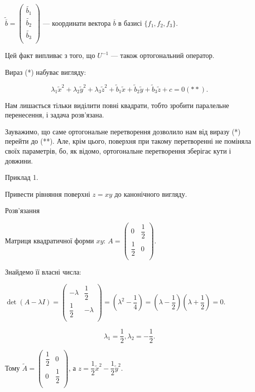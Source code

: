 $\tilde{\overline{b}} = \begin{pmatrix}
	\tilde{b_1} \\
	\tilde{b_2} \\
	\tilde{b_3} \\
\end{pmatrix}$ --- координати вектора $\overline{b}$ в базисі $\{f_1, f_2, f_3\}$.

Цей факт випливає з того, що $U^{-1}$ --- також ортогональний оператор.

Вираз (*) набуває вигляду:

$$\lambda_1 \tilde{x}^2 + \lambda_2 \tilde{y}^2 + \lambda_3 \tilde{z}^2
+ \tilde{b}_1 \tilde{x} + \tilde{b}_2 \tilde{y} + \tilde{b}_3 \tilde{z}
+ c = 0 (**).$$

Нам лишається тільки виділити повні квадрати, тобто зробити
паралельне перенесення, і задача розв’язана.

Зауважимо, що саме ортогональне перетворення дозволило нам від
виразу (*) перейти до (**). Але, крім цього, поверхня при такому
перетворенні не поміняла своїх параметрів, бо, як відомо, ортогональне
перетворення зберігає кути і довжини.

Приклад 1.

Привести рівняння поверхні $z = x y$ до канонічного вигляду.

Розв’язання

Матриця квадратичної форми $x y$: $A = \begin{pmatrix}
	0 & \dfrac{1}{2} \\
	\dfrac{1}{2} & 0 \\
\end{pmatrix}.$

Знайдемо її власні числа: 

$\det(A-\lambda I) = \begin{pmatrix}
	-\lambda & \dfrac{1}{2} \\
	\dfrac{1}{2} & -\lambda \\
\end{pmatrix} = (\lambda^2 - \dfrac{1}{4}) = (\lambda - \dfrac{1}{2})(\lambda + \dfrac{1}{2}) = 0.$

$$\lambda_1 = \dfrac{1}{2}, \lambda_2 = -\dfrac{1}{2}.$$

Тому $\tilde{A} = \begin{pmatrix}
	\dfrac{1}{2} & 0 \\
	0 & \dfrac{1}{2} \\
\end{pmatrix}$, а $z = \dfrac{1}{2} \tilde{x}^2 - \dfrac{1}{2} \tilde{y}^2.$


